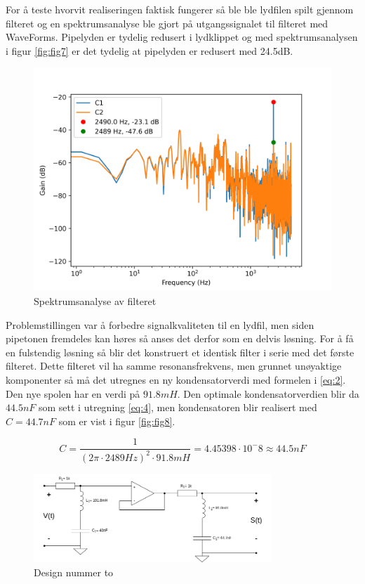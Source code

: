 For å teste hvorvit realiseringen faktisk fungerer så ble ble lydfilen spilt gjennom filteret og en spektrumsanalyse ble gjort på utgangssignalet til filteret med WaveForms. Pipelyden er tydelig redusert i lydklippet og med spektrumsanalysen i figur \autoref{fig:fig7} er det tydelig at pipelyden er redusert med 24.5dB. 

\begin{figure}[!h]
	\centering
	\includegraphics[width=1\textwidth]{Bilder/spectrum2K.png}
	\caption{Spektrumsanalyse av filteret}
	\label{fig:fig7}
\end{figure}

Problemstillingen var å forbedre signalkvaliteten til en lydfil, men siden pipetonen fremdeles kan høres så anses det derfor som en delvis løsning. For å få en fulstendig løsning så blir det konstruert et identisk filter i serie med det første filteret. Dette filteret vil ha samme resonansfrekvens, men grunnet unøyaktige komponenter så må det utregnes en ny kondensatorverdi med formelen i \autoref{eq:2}. Den nye spolen har en verdi på $91.8mH$. Den optimale kondensatorverdien blir da $44.5nF$ som sett i utregning \autoref{eq:4}, men kondensatoren blir realisert med $C = 44.7nF$ som er vist i figur \autoref{fig:fig8}.

\begin{equation}
	C = \frac{1}{(2\pi \cdot 2489Hz)^2 \cdot 91.8mH} = 4.45398 \cdot 10^-8 \approx 44.5nF
	\label{eq:4}
\end{equation}

\begin{figure}[!h]
	\centering
	\includegraphics[width=0.8\textwidth]{Bilder/RLC_filterV2.drawio.png}
	\caption{Design nummer to}
	\label{fig:fig8}
\end{figure}

